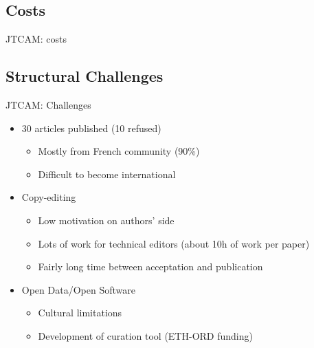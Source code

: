 \documentclass[10pt,compress,serif,aspectratio=169]{beamer}
\begin{document}
\subsection{Costs}
\begin{frame}[t]{JTCAM: costs}
\end{frame}
\subsection{Structural Challenges}

\begin{frame}[t]{JTCAM: Challenges}
  \begin{itemize}
  \item 30 articles published (10 refused)
    \begin{itemize}
    \item Mostly from French community (90\%)
    \item Difficult to become international
    \end{itemize}
  \item Copy-editing
    \begin{itemize}
    \item Low motivation on authors' side
    \item Lots of work for technical editors (about 10h of work per paper)
    \item Fairly long time between acceptation and publication 
    \end{itemize}
  \item Open Data/Open Software 
    \begin{itemize}
    \item Cultural limitations
    \item Development of curation tool (ETH-ORD funding)
    \end{itemize}

  \end{itemize}
\end{frame}

\end{document}
